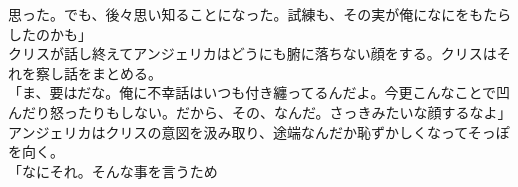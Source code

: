 \documentclass[b5j,10pt,openany]{jsbook}
\begin{document}
思った。でも、後々思い知ることになった。試練も、その実が俺になにをもたらしたのかも」\\クリスが話し終えてアンジェリカはどうにも腑に落ちない顔をする。クリスはそれを察し話をまとめる。\\「ま、要はだな。俺に不幸話はいつも付き纏ってるんだよ。今更こんなことで凹んだり怒ったりもしない。だから、その、なんだ。さっきみたいな顔するなよ」\\アンジェリカはクリスの意図を汲み取り、途端なんだか恥ずかしくなってそっぽを向く。\\「なにそれ。そんな事を言うため
\end{document}

